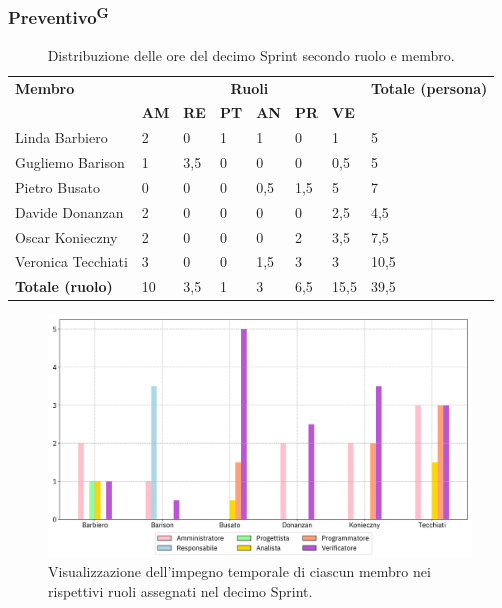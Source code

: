 \documentclass[8pt]{article}
\newcommand{\glossterm}[1]{#1\textsuperscript{G}} %
\begin{document}
\subsubsection{\glossterm{Preventivo}}
\begin{table}[ht!]
	\centering
	\begin{tabular}{p{4cm} p{1cm} p{1cm} p{1cm} p{1cm} p{1cm} p{1cm} p{3cm}}
		\toprule
        \textbf{Membro} & \multicolumn{6}{c}{\textbf{Ruoli}} & \textbf{Totale (persona)}\\
		& \textbf{AM} & \textbf{RE} & \textbf{PT} & \textbf{AN} & \textbf{PR} & \textbf{VE}\\
		\midrule
        Linda Barbiero & 2 & 0 & 1 & 1 & 0 & 1 & 5 \\ 
        Gugliemo Barison & 1 & 3,5 & 0 & 0 & 0 & 0,5 & 5 \\ 
        Pietro Busato & 0 & 0 & 0 & 0,5 & 1,5 & 5 & 7 \\ 
        Davide Donanzan & 2 & 0 & 0 & 0 & 0 & 2,5 & 4,5 \\ 
        Oscar Konieczny & 2 & 0 & 0 & 0 & 2 & 3,5 & 7,5 \\ 
        Veronica Tecchiati & 3 & 0 & 0 & 1,5 & 3 & 3 & 10,5 \\
        \midrule
        \textbf{Totale (ruolo)} & 10 & 3,5 & 1 & 3 & 6,5 & 15,5 & 39,5 \\ 
	\bottomrule
	\end{tabular}
	\caption{Distribuzione delle ore del decimo Sprint secondo ruolo e membro.}
	\label{table:Distribuzione delle ore del decimo Sprint secondo ruolo e membro}
\end{table}
\begin{figure}[ht!]
    \centering
    \includegraphics[width=15cm]{./images_pdp/istogramma_periodo_10.png}
    \caption{Visualizzazione dell'impegno temporale di ciascun membro nei rispettivi ruoli assegnati
    nel decimo Sprint.}
    \label{figure:Visualizzazione dell'impegno temporale di ciascun membro nei rispettivi ruoli
    assegnati nel decimo Sprint}
\end{figure}
\end{document}
